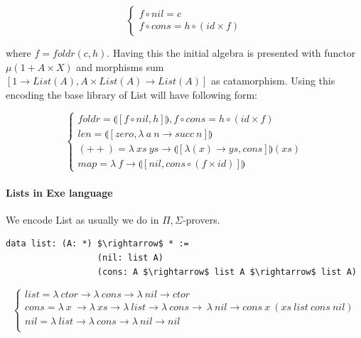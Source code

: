 \documentclass[11pt,oneside]{article}
\begin{document}
$$
\begin{cases}
  f \circ nil  = c \\
  f \circ cons = h \circ (id \times f)
\end{cases}
$$

  where $f = foldr(c,h)$. Having this the initial algebra is presented with functor
  $\mu (1 + A \times X)$ and morphisms sum $[1 \rightarrow List(A), A \times List(A) \rightarrow List(A)]$
  as catamorphism. Using this encoding the base library of List will have following form:

$$
\begin{cases}
 foldr = \llparenthesis [ f \circ nil , h] \rrparenthesis, f \circ cons = h \circ (id \times f)\\
 len = \llparenthesis [ zero, \lambda\ a\ n \rightarrow succ\ n ] \rrparenthesis \\
 (++) = \lambda\ xs\ ys \rightarrow \llparenthesis [ \lambda (x) \rightarrow ys, cons ] \rrparenthesis (xs) \\
 map = \lambda\ f \rightarrow \llparenthesis [ nil, cons \circ (f \times id)] \rrparenthesis
\end{cases}
$$

  \paragraph{Lists in Exe language}

  We encode List as usually we do in $\Pi,\Sigma$-provers.

\begin{lstlisting}[mathescape=true]
             data list: (A: *) $\rightarrow$ * :=
                  (nil: list A)
                  (cons: A $\rightarrow$ list A $\rightarrow$ list A)
\end{lstlisting}

$$
\begin{cases}
list = \lambda\ ctor \rightarrow \lambda\ cons \rightarrow \lambda\ nil \rightarrow ctor\\
cons = \lambda\ x\ \rightarrow \lambda\ xs \rightarrow \lambda\ list \rightarrow \lambda\ cons \rightarrow\ \lambda\ nil \rightarrow cons\ x\ (xs\ list\ cons\ nil)\\
nil = \lambda\ list \rightarrow \lambda\ cons \rightarrow \lambda\ nil \rightarrow nil\\
\end{cases}
$$
\end{document}
